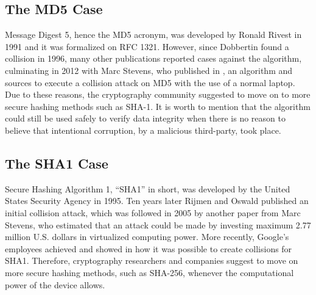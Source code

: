 \subsection{The MD5 Case}
Message Digest 5, hence the MD5 acronym, was developed by Ronald Rivest in 1991 and it was formalized on RFC 1321. However, since Dobbertin found a collision\cite{dobbertin} in 1996, many other publications reported cases against the algorithm, culminating in 2012 with Marc Stevens, who published in \cite{stevens}, an algorithm and sources to execute a collision attack on MD5 with the use of a normal laptop. Due to these reasons, the cryptography community suggested to move on to more secure hashing methods such as SHA-1. It is worth to mention that the algorithm could still be used safely to verify data integrity when there is no reason to believe that intentional corruption, by a malicious third-party, took place.

\subsection{The SHA1 Case}
Secure Hashing Algorithm 1, \enquote{SHA1} in short, was developed by the United States Security Agency in 1995. Ten years later Rijmen and Oswald published an initial collision attack\cite{sha1b1}, which was followed in 2005 by another paper from Marc Stevens\cite{sha1b2}, who estimated that an attack could be made by investing maximum 2.77 million U.S. dollars in virtualized computing power. More recently, Google's employees achieved and showed in \cite{sha1b3} how it was possible to create collisions for SHA1. Therefore, cryptography researchers and companies suggest to move on more secure hashing methods, such as SHA-256, whenever the computational power of the device allows.

